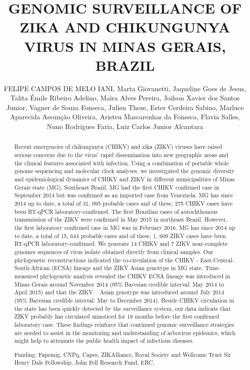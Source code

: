\documentclass[twoside]{article}
\title{\vspace{-15mm}\fontsize{24pt}{10pt}\selectfont\textbf{ GENOMIC SURVEILLANCE OF ZIKA AND CHIKUNGUNYA VIRUS IN MINAS GERAIS,  BRAZIL }} %
\author{ FELIPE CAMPOS DE MELO IANI, Marta Giovanetti, Jaqueline Goes de Jesus, Talita \'Emile Ribeiro Adelino, Maira Alves Pereira, Joilson Xavier dos Santos Junior, Vagner de Souza Fonseca, Julien Theze, Ester Cerdeira Sabino, Marluce Aparecida Assun\c{c}\~ao Oliveira, Aristeu Mascarenhas da Fonseca, Flavia Salles, Nuno Rodrigues Faria, Luiz Carlos Junior Alcantara }
\affil{ Laborat\'orio de Gen\'etica Celular e Molecular,  ICB,  Universidade Federal de Minas Gerais,  Belo Horizonte,  Minas Gerais,  Brazil }
\date{}
\begin{document}
  
  
  \maketitle %
  
  
  \thispagestyle{fancy} %
  
  
  \begin{abstract}
  Recent emergencies of chikungunya (CHIKV) and zika (ZIKV) viruses have raised serious concerns due to the virus’ rapid dissemination into new geographic areas and the clinical features associated with infection. Using a combination of portable whole genome sequencing and molecular clock analyses,  we investigated the genomic diversity and epidemiological dynamics of CHIKV and ZIKV in different municipalities of Minas Gerais state (MG),  Southeast Brazil. MG had the first CHIKV confirmed case in September 2014 but was confirmed as an imported case from Venezuela. MG has since 2014 up to date,  a total of 31, 095 probable cases and of these,  275 CHIKV cases have been RT-qPCR laboratory-confirmed. The first Brazilian cases of autochthonous transmission of the ZIKV were confirmed in May 2015 in northeast Brazil. However,  the first laboratory confirmed case in MG was in February 2016. MG has since 2014 up to date,  a total of 15, 644 probable cases and of these,  1, 609 ZIKV cases have been RT-qPCR laboratory-confirmed.
We generate 14 CHIKV and 7 ZIKV near-complete genomes sequences of virus isolate obtained directly from clinical samples. Our phylogenetic reconstructions indicated the co-circulation of the CHIKV - East-Central-South-African (ECSA) lineage and the ZIKV Asian genotype in MG state. Time-measured phylogenetic analysis revealed the CHIKV ECSA lineage was introduced in Minas Gerais around November 2014 (95\% Bayesian credible interval: May 2014 to April 2015) and that the ZIKV – Asian genotype was introduced around July 2014 (95\% Bayesian credible interval: May to December 2014). Beside CHIKV circulation in the state has been quickly detected by the surveillance system,  our data indicate that ZIKV probably has circulated unnoticed for 18 months before the first confirmed laboratory case. These findings reinforce that continued genomic surveillance strategies are needed to assist in the monitoring and understanding of arbovirus epidemics,  which might help to attenuate the public health impact of infectious diseases.
  
  Funding: Fapemig,  CNPq,  Capes,  ZIKAlliance,  Royal Society and Wellcome Trust Sir Henry Dale Fellowship,  John Fell Research Fund,  ERC,  \\ 
  \end{abstract}
  
\end{document}
